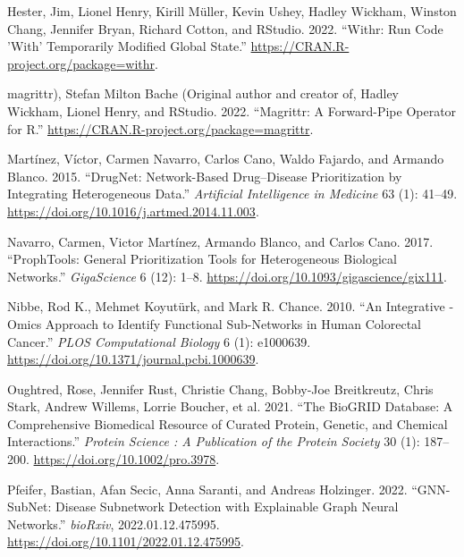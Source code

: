 \documentclass{article}
\newlength{\cslhangindent}
\newlength{\cslentryspacingunit} %
\newenvironment{CSLReferences}[2] %
 {%
  \setlength{\parindent}{0pt}
  \ifodd #1
  \let\oldpar\par
  \def\par{\hangindent=\cslhangindent\oldpar}
  \fi
  \setlength{\parskip}{#2\cslentryspacingunit}
 }%
 {}
\begin{document}
\begin{CSLReferences}{1}{0}
\leavevmode{}%
Hester, Jim, Lionel Henry, Kirill Müller, Kevin Ushey, Hadley Wickham,
Winston Chang, Jennifer Bryan, Richard Cotton, and RStudio. 2022.
{``Withr: {Run} {Code} '{With}' {Temporarily} {Modified} {Global}
{State}.''} \url{https://CRAN.R-project.org/package=withr}.

\leavevmode{}%
magrittr), Stefan Milton Bache (Original author and creator of, Hadley
Wickham, Lionel Henry, and RStudio. 2022. {``Magrittr: {A}
{Forward}-{Pipe} {Operator} for {R}.''}
\url{https://CRAN.R-project.org/package=magrittr}.

\leavevmode{}%
Martínez, Víctor, Carmen Navarro, Carlos Cano, Waldo Fajardo, and
Armando Blanco. 2015. {``{DrugNet}: {Network}-Based Drug--Disease
Prioritization by Integrating Heterogeneous Data.''} \emph{Artificial
Intelligence in Medicine} 63 (1): 41--49.
\url{https://doi.org/10.1016/j.artmed.2014.11.003}.

\leavevmode{}%
Navarro, Carmen, Victor Martínez, Armando Blanco, and Carlos Cano. 2017.
{``{ProphTools}: General Prioritization Tools for Heterogeneous
Biological Networks.''} \emph{GigaScience} 6 (12): 1--8.
\url{https://doi.org/10.1093/gigascience/gix111}.

\leavevmode{}%
Nibbe, Rod K., Mehmet Koyutürk, and Mark R. Chance. 2010. {``An
{Integrative} -Omics {Approach} to {Identify} {Functional}
{Sub}-{Networks} in {Human} {Colorectal} {Cancer}.''} \emph{PLOS
Computational Biology} 6 (1): e1000639.
\url{https://doi.org/10.1371/journal.pcbi.1000639}.

\leavevmode{}%
Oughtred, Rose, Jennifer Rust, Christie Chang, Bobby‐Joe Breitkreutz,
Chris Stark, Andrew Willems, Lorrie Boucher, et al. 2021. {``The
{BioGRID} Database: {A} Comprehensive Biomedical Resource of Curated
Protein, Genetic, and Chemical Interactions.''} \emph{Protein Science :
A Publication of the Protein Society} 30 (1): 187--200.
\url{https://doi.org/10.1002/pro.3978}.

\leavevmode{}%
Pfeifer, Bastian, Afan Secic, Anna Saranti, and Andreas Holzinger. 2022.
{``{GNN}-{SubNet}: Disease Subnetwork Detection with Explainable {Graph}
{Neural} {Networks}.''} \emph{bioRxiv}, 2022.01.12.475995.
\url{https://doi.org/10.1101/2022.01.12.475995}.


\end{CSLReferences}
\end{document}
